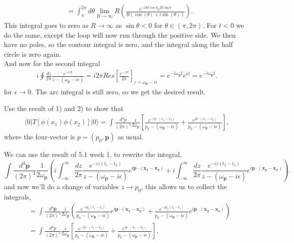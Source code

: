 \documentclass[working, oneside]{../../Preambles/tuftebook}
\begin{document}
\begin{solution}
\begin{align*}
&=   \int_{\pi}^{2\pi}d\theta \lim_{R \to \infty} R \left( \frac{e^{-iRt\cos\theta }e^{Rt\sin \theta }   }{R\left( \cos\left( \theta  \right) + i\sin\left( \theta  \right)  \right) } \right) 
.\end{align*}
This integral goes to zero as $R \to \infty$ as $\sin \theta < 0$ for $\theta \in \left( \pi, 2\pi \right) $. For $t<0$ we do the same, except the loop will now run through the positive side. We then have no poles, so the contour integral is zero, and the integral along the half circle is zero again. \\
And now for the second integral
\begin{align*}
    i \oint \frac{dz}{2\pi} \frac{e^{-izt}}{z - \left( \omega_{\mathbf{p}} - i\epsilon
    \right) } = i 2\pi Res\left[ \frac{e^{-izt}}{2\pi} \right] _{z = \omega_{\mathbf{p}} - i\epsilon} = e^{-i\omega_{\mathbf{p}}t}e^{\epsilon t} = e^{-i\omega_{\mathbf{p}}t}
.\end{align*}
for $\epsilon \to 0$. The arc integral is still zero, so we get the desired result.
\end{solution}
\begin{exercise}[3]
Use the result of 1) and 2) to show that
\begin{align*}
\langle 0 | T \left[ \phi(x_1) \phi(x_2) \right] | 0 \rangle = \int \frac{d^4 p}{(2\pi)^4} \frac{i}{2 \omega_\mathbf{p}} \left[ \frac{e^{-ip \cdot (x_1 - x_2)}}{p_0 - (\omega_\mathbf{p} - i\epsilon)} + \frac{e^{ip \cdot (x_1 - x_2)}}{p_0 - (\omega_\mathbf{p} - i\epsilon)} \right],
\end{align*}
where the four-vector is $p = (p_0, \mathbf{p})$ as usual.
\end{exercise}
We can use the result of 5.1 week 1, to rewrite the integral,
\[
\int \frac{d^{3}\mathbf{p}}{\left( 2\pi \right) ^3}\frac{1}{2\omega_{\mathbf{p}}} \left( 
    i \int_{-\infty}^\infty \frac{dz}{2\pi} \frac{e^{-iz\left( t_1-t_2 \right) }}{z - (\omega_\mathbf{p} - i\epsilon)} e^{i\mathbf{p}\cdot \left( \mathbf{x_1}-\mathbf{x_2} \right)} 
    + 
    i \int_{-\infty}^\infty \frac{dz}{2\pi} \frac{e^{-iz\left( t_2-t_1 \right) }}{z - (\omega_\mathbf{p} - i\epsilon)} e^{i\mathbf{p}\cdot \left( \mathbf{x_2}-\mathbf{x_1} \right)} 
\right)
.\] 
and now we'll do a change of variables $z \to  p_0$, this allows us to collect the integrals,
\begin{align*}
&=  \int \frac{d^{4}\mathbf{p}}{\left( 2\pi \right)^4} \frac{i}{2\omega_{\mathbf{p}}} \left( 
    \frac{e^{-ip_0\left( t_1-t_2 \right)}}{p_0 - (\omega_\mathbf{p} - i\epsilon)} e^{i\mathbf{p}\cdot \left( \mathbf{x_1}-\mathbf{x_2} \right)} 
    + 
    \frac{e^{-ip_0\left( t_2-t_1 \right)}}{p_0 - (\omega_\mathbf{p} - i\epsilon)} e^{i\mathbf{p}\cdot \left( \mathbf{x_2}-\mathbf{x_1} \right)} 
\right) \\
& = \int \frac{d^4 p}{(2\pi)^4} \frac{i}{2 \omega_\mathbf{p}} \left[ \frac{e^{-ip \cdot (x_1 - x_2)}}{p_0 - (\omega_\mathbf{p} - i\epsilon)} + \frac{e^{ip \cdot (x_1 - x_2)}}{p_0 - (\omega_\mathbf{p} - i\epsilon)} \right],
\end{align*}
\end{document}
